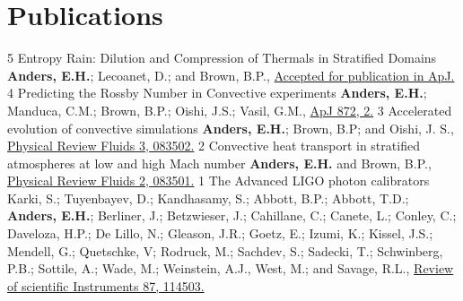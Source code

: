 \section{Publications}

	  {5}
	  {Entropy Rain: Dilution and Compression of Thermals in Stratified Domains}
	  {
		  \textbf{Anders, E.H.}; Lecoanet, D.; and Brown, B.P., 
		  \href{https://ui.adsabs.harvard.edu/abs/2019arXiv190602342A/abstract}{Accepted for publication in ApJ.}
	  }
\cvpub{}
	  {4}
	  {Predicting the Rossby Number in Convective experiments}
	  {
		  \textbf{Anders, E.H.}; Manduca, C.M.; Brown, B.P.; Oishi, J.S.; Vasil, G.M., 
		  \href{https://iopscience.iop.org/article/10.3847/1538-4357/aaff61}{ApJ 872, 2.}
	  }
	  {3}
	  {Accelerated evolution of convective simulations}
	  {
		  \textbf{Anders, E.H.}; Brown, B.P; and Oishi, J. S.,
		  \href{https://journals.aps.org/prfluids/abstract/10.1103/PhysRevFluids.3.083502}{Physical Review Fluids 3, 083502.}
	  }
	  {2}
	  {Convective heat transport in stratified atmospheres at low and high Mach number}
	  {
		  \textbf{Anders, E.H.} and Brown, B.P.,
		  \href{https://journals.aps.org/prfluids/abstract/10.1103/PhysRevFluids.2.083501}{Physical Review Fluids 2, 083501.}
	  }
	  {1}
	  {The Advanced LIGO photon calibrators}
	  {
			Karki, S.; Tuyenbayev, D.; Kandhasamy, S.; Abbott, B.P.; Abbott, T.D.; \textbf{Anders, E.H.};
			Berliner, J.; Betzwieser, J.; Cahillane, C.; Canete, L.; Conley, C.; Daveloza, H.P.; De Lillo, N.;
			Gleason, J.R.; Goetz, E.; Izumi, K.; Kissel, J.S.; Mendell, G.; Quetschke, V; Rodruck, M.; Sachdev, S.;
			Sadecki, T.; Schwinberg, P.B.; Sottile, A.; Wade, M.; Weinstein, A.J., West, M.; and Savage, R.L.,
			\href{https://aip.scitation.org/doi/10.1063/1.4967303}{Review of scientific Instruments 87, 114503.}
	  }
